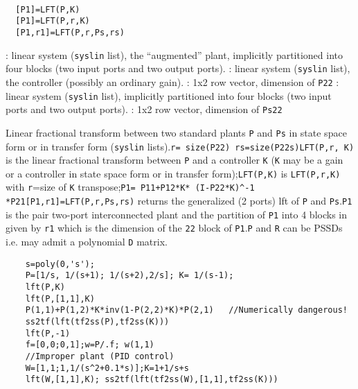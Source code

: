 \begin{mandesc}
   \\ %
\end{mandesc}
\begin{calling_sequence}
\begin{verbatim}
  [P1]=LFT(P,K)  
  [P1]=LFT(P,r,K)  
  [P1,r1]=LFT(P,r,Ps,rs)  
\end{verbatim}
\end{calling_sequence}
\begin{parameters}
  \begin{varlist}
    : linear system (\verb!syslin! list), the ``augmented'' plant, implicitly partitioned into four blocks (two input ports and two output ports).
    : linear system (\verb!syslin! list), the controller (possibly an ordinary gain).
    : 1x2 row vector, dimension of \verb!P22!
    : linear system (\verb!syslin! list), implicitly partitioned into four blocks (two input ports and two output ports).
    : 1x2 row vector, dimension of \verb!Ps22!
  \end{varlist}
\end{parameters}
\begin{mandescription}
  Linear fractional transform between two standard plants
  \verb!P! and \verb!Ps! in state space form or in
  transfer form (\verb!syslin! lists).\verb!r= size(P22) rs=size(P22s)!\verb!LFT(P,r, K)! is the linear fractional transform
  between \verb!P! and a controller \verb!K!
  (\verb!K! may be a gain or a controller in state space form
  or in transfer form);\verb!LFT(P,K)! is \verb!LFT(P,r,K)! with
  \verb!r!=size of \verb!K! transpose;\verb!P1= P11+P12*K* (I-P22*K)^-1 *P21!\verb![P1,r1]=LFT(P,r,Ps,rs)! returns the generalized (2
  ports) lft of \verb!P! and \verb!Ps!.\verb!P1! is the pair two-port interconnected plant and the
  partition of \verb!P1! into 4 blocks in given by
  \verb!r1! which is the dimension of the \verb!22!
  block of \verb!P1!.\verb!P! and \verb!R! can be PSSDs i.e. may admit a
  polynomial \verb!D! matrix.
\end{mandescription}
\begin{examples}
  \begin{Verbatim}
    s=poly(0,'s');
    P=[1/s, 1/(s+1); 1/(s+2),2/s]; K= 1/(s-1);
    lft(P,K)
    lft(P,[1,1],K)
    P(1,1)+P(1,2)*K*inv(1-P(2,2)*K)*P(2,1)   //Numerically dangerous!
    ss2tf(lft(tf2ss(P),tf2ss(K)))
    lft(P,-1)
    f=[0,0;0,1];w=P/.f; w(1,1)
    //Improper plant (PID control)
    W=[1,1;1,1/(s^2+0.1*s)];K=1+1/s+s
    lft(W,[1,1],K); ss2tf(lft(tf2ss(W),[1,1],tf2ss(K)))
  \end{Verbatim}
\end{examples}
\begin{manseealso}
       
\end{manseealso}
